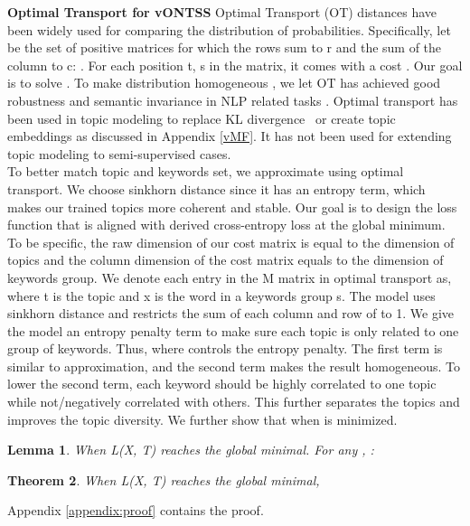 \documentclass[11pt]{article}
\newtheorem{theorem}{Theorem}[section]
\newtheorem{lemma}[theorem]{Lemma}
\begin{document}
\textbf{Optimal Transport for vONTSS} Optimal Transport (OT) distances \cite{chen2019improving, torres2021survey} have been widely used for comparing the distribution of probabilities. Specifically, let  be the set of positive  matrices for which the rows sum to r and the sum of the column to c:
. For each position t, s in the matrix, it comes with a cost . Our goal is to solve . To make distribution homogeneous \cite{cuturi2013sinkhorn}, we let   
 OT has achieved good robustness and semantic invariance in NLP related tasks \cite{chen2019improving}. Optimal transport has been used in topic modeling to replace KL divergence~\cite{zhao2020neural,Huynh2020OTLDAAG,Wang2022RepresentingMO}  or create topic embeddings \cite{xu2018distilled} as discussed in Appendix \ref{vMF}. It has not been used for extending topic modeling to semi-supervised cases. \\
To better match topic and keywords set, we approximate  using optimal transport. We choose sinkhorn distance since it has an entropy term, which makes our trained topics more coherent and stable. Our goal is to design the loss function that is aligned with derived cross-entropy loss at the global minimum.  To be specific, the raw dimension of our cost matrix is equal to the dimension of topics and the column dimension of the cost matrix equals to the dimension of keywords group. We denote each entry in the M matrix in optimal transport as,  where t is the topic and x is the word in a keywords group s. The model uses sinkhorn distance and restricts the sum of each column and row of  to 1. We give the model an entropy penalty term to make sure each topic is only related to one group of keywords. Thus,  where  controls the entropy penalty. The first term is similar to  approximation, and the second term makes the result homogeneous. To lower the second term, each keyword should be highly correlated to one topic while not/negatively correlated with others. This further separates the topics and improves the topic diversity. We further show that  when  is minimized. 
\begin{lemma} When L(X, T) reaches the global minimal. For any , : 


\end{lemma}


\begin{theorem}


When L(X, T) reaches the global minimal, 
\end{theorem}
Appendix \ref{appendix:proof} contains the proof. 
\end{document}

